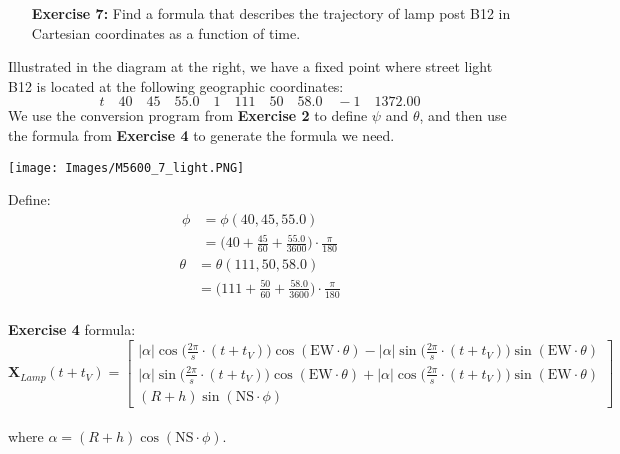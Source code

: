 \documentclass[11pt]{article}
\theoremstyle{definition}
\newcommand{\1}[1]{\mathbf{1} \left \{ #1 \right \}}
\begin{document}
\begin{itemize}
\item[{\textbf{Exercise 7:}}] Find a formula that describes the trajectory of lamp post B12 in Cartesian coordinates as a function of time.
\end{itemize}
\begin{minipage}{0.6\linewidth}
Illustrated in the diagram at the right, we have a fixed point where street light B12 is located at the following geographic coordinates:
\[t \quad 40 \quad 45 \quad 55.0 \quad 1 \quad 111 \quad 50 \quad 58.0 \quad -1 \quad 1372.00\]
We use the conversion program from \textbf{Exercise 2} to define $\psi$ and $\theta$, and then use the formula from \textbf{Exercise 4} to generate the formula we need.
\end{minipage} \qquad
\begin{minipage}{0.4\linewidth}
\texttt{[image: Images/M5600\_7\_light.PNG]}
\end{minipage}
Define:
\begin{align*}
    \phi &= \phi(40, 45, 55.0) \\
    &= \bigg(40 + \frac{45}{60} + \frac{55.0}{3600}\bigg) \cdot \frac{\pi}{180}
\end{align*}
\begin{align*}
    \theta &= \theta(111, 50, 58.0) \\
    &= \bigg(111 + \frac{50}{60} + \frac{58.0}{3600}\bigg) \cdot \frac{\pi}{180}
\end{align*}
\\
\textbf{Exercise 4} formula:
\[\textbf{X}_{Lamp}(t+t_V) = \begin{bmatrix}
|\alpha| \cos \big(\frac{2\pi}{s} \cdot (t+t_V) \big) \cos (\textrm{EW} \cdot \theta) - |\alpha| \sin \big(\frac{2\pi}{s} \cdot (t+t_V) \big) \sin (\textrm{EW} \cdot \theta) \\
|\alpha| \sin \big(\frac{2\pi}{s} \cdot (t+t_V) \big) \cos (\textrm{EW} \cdot \theta) + |\alpha| \cos \big(\frac{2\pi}{s} \cdot (t+t_V) \big) \sin (\textrm{EW} \cdot \theta) \\
(R + h) \sin (\textrm{NS} \cdot \phi)
\end{bmatrix}\] \\
where \(\alpha = (R + h) \cos (\textrm{NS} \cdot \phi)\).
\end{document}
